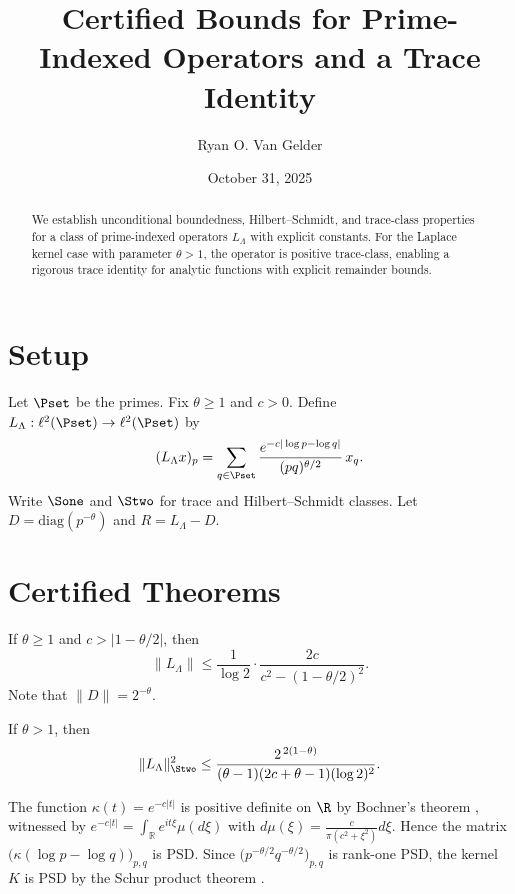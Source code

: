 \documentclass[11pt]{nyjm}
\title{Certified Bounds for Prime-Indexed Operators and a Trace Identity}
\author{Ryan O. Van Gelder}
\date{October 31, 2025}
\numberwithin{equation}{section}
\begin{document}
\begin{abstract}
We establish unconditional boundedness, Hilbert--Schmidt, and trace-class properties for a class of prime-indexed operators $L_\Lambda$ with explicit constants. For the Laplace kernel case with parameter $\theta>1$, the operator is positive trace-class, enabling a rigorous trace identity for analytic functions with explicit remainder bounds.
\end{abstract}
\maketitle
\section{Setup}
Let $\Pset$ be the primes. Fix $\theta\ge 1$ and $c>0$. Define $L_\Lambda:\ell^2(\Pset)\to\ell^2(\Pset)$ by
\[
(L_\Lambda x)_p=\sum_{q\in \Pset}\frac{e^{-c|\log p-\log q|}}{(pq)^{\theta/2}}\,x_q.
\]
Write $\Sone$ and $\Stwo$ for trace and Hilbert--Schmidt classes. Let $D=\mathrm{diag}(p^{-\theta})$ and $R=L_\Lambda-D$.

\section{Certified Theorems}
\begin{theorem}[T1: Boundedness]
\label{thm:T1}
If $\theta\ge 1$ and $c>|1-\theta/2|$, then
\[
\|L_\Lambda\| \le \frac{1}{\log 2}\cdot \frac{2c}{c^2-(1-\theta/2)^2}.
\]
Note that $\|D\|=2^{-\theta}$.
\end{theorem}

\begin{theorem}
\label{thm:T2}
If $\theta>1$, then
\[
\|L_\Lambda\|_{\Stwo}^2 \le \frac{2^{\,2(1-\theta)}}{(\theta-1)(2c+\theta-1)(\log 2)^2}.
\]
\end{theorem}

\begin{lemma}[Positivity]
\label{lem:PSD}
The function $\kappa(t)=e^{-c|t|}$ is positive definite on $\R$ by Bochner's theorem \cite[Theorem IX.11.13]{DunfordSchwartz}, witnessed by 
$ e^{-c|t|} = \int_{\mathbb{R}} e^{it\xi} \mu(d\xi) $ 
with $ d\mu(\xi) = \frac{c}{\pi(c^2+\xi^2)} d\xi $. 
Hence the matrix $\big(\kappa(\log p-\log q)\big)_{p,q}$ is PSD. 
Since $\big(p^{-\theta/2}q^{-\theta/2}\big)_{p,q}$ is rank-one PSD, 
the kernel $K$ is PSD by the Schur product theorem \cite[Theorem 5.2.1]{HornJohnson}.
\end{lemma}
\end{document}
